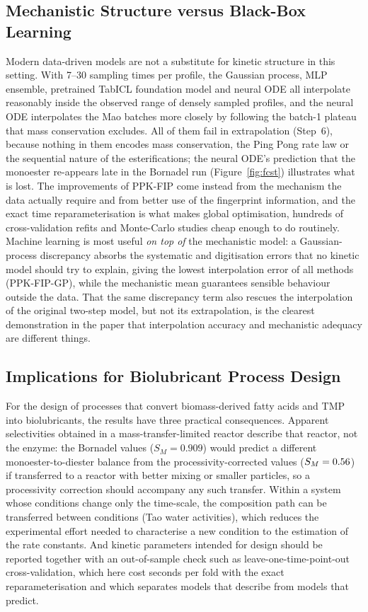 \subsection{Mechanistic Structure versus Black-Box Learning}
Modern data-driven models are not a substitute for kinetic structure in this setting. With 7--30 sampling times per profile, the Gaussian process, MLP ensemble, pretrained TabICL foundation model and neural ODE all interpolate reasonably inside the observed range of densely sampled profiles, and the neural ODE interpolates the Mao batches more closely by following the batch-1 plateau that mass conservation excludes. All of them fail in extrapolation (Step~6), because nothing in them encodes mass conservation, the Ping Pong rate law or the sequential nature of the esterifications; the neural ODE's prediction that the monoester re-appears late in the Bornadel run (Figure~\ref{fig:fcst}) illustrates what is lost. The improvements of PPK-FIP come instead from the mechanism the data actually require and from better use of the fingerprint information, and the exact time reparameterisation is what makes global optimisation, hundreds of cross-validation refits and Monte-Carlo studies cheap enough to do routinely. Machine learning is most useful \emph{on top of} the mechanistic model: a Gaussian-process discrepancy absorbs the systematic and digitisation errors that no kinetic model should try to explain, giving the lowest interpolation error of all methods (PPK-FIP-GP), while the mechanistic mean guarantees sensible behaviour outside the data. That the same discrepancy term also rescues the interpolation of the original two-step model, but not its extrapolation, is the clearest demonstration in the paper that interpolation accuracy and mechanistic adequacy are different things.

\subsection{Implications for Biolubricant Process Design}
For the design of processes that convert biomass-derived fatty acids and TMP into biolubricants, the results have three practical consequences. Apparent selectivities obtained in a mass-transfer-limited reactor describe that reactor, not the enzyme: the Bornadel values ($S_M=0.909$) would predict a different monoester-to-diester balance from the processivity-corrected values ($S_M=0.56$) if transferred to a reactor with better mixing or smaller particles, so a processivity correction should accompany any such transfer. Within a system whose conditions change only the time-scale, the composition path can be transferred between conditions (Tao water activities), which reduces the experimental effort needed to characterise a new condition to the estimation of the rate constants. And kinetic parameters intended for design should be reported together with an out-of-sample check such as leave-one-time-point-out cross-validation, which here cost seconds per fold with the exact reparameterisation and which separates models that describe from models that predict.

